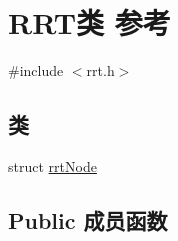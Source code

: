 \hypertarget{classRRT}{\section{R\-R\-T类 参考}
\label{classRRT}
}


{\ttfamily \#include $<$rrt.\-h$>$}

\subsection*{类}
\begin{DoxyCompactItemize}
\item 
struct \hyperlink{structRRT_1_1rrtNode}{rrt\-Node}
\end{DoxyCompactItemize}
\subsection*{Public 成员函数}
